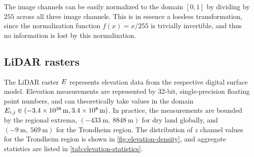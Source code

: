 The image channels can be easily normalized to the domain $[0, 1]$ by dividing by $255$ across all three image channels.
This is in essence a lossless transformation, since the normalization function $f(x) = x/255$ is trivially invertible, and thus no information is lost by this normalization.

\subsection{LiDAR rasters}

The LiDAR raster $E$ represents elevation data from the respective digital surface model.
Elevation measurements are represented by 32-bit, single-precision floating point numbers, and can theoretically take values in the domain $E_{i,j} \in (\SI{-3.4e38}{\meter},\allowbreak\SI{3.4e8}{\meter})$.
In practice, the measurements are bounded by the regional extrema, $(\SI{-433}{\meter},~\SI{8848}{\meter})$ for dry land globally, and $(\SI{-9}{\meter},~\SI{569}{\meter})$ for the Trondheim region.
The distribution of $z$ channel values for the Trondheim region is shown in \cref{fig:elevation-density}, and aggregate statistics are listed in \cref{tab:elevation-statistics}.

\begin{figure}[H]
  \begin{floatrow}
    \hspace{-1.8em}
  \end{floatrow}
\end{figure}

